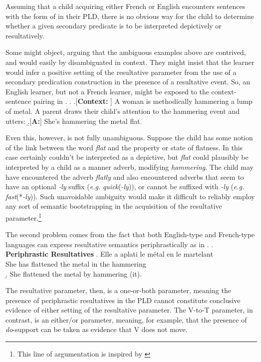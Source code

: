 \documentclass[MilwayThesis]{subfiles}
\begin{document}
Assuming that a child acquiring either French or English encounters sentences with the form of \LLast in their PLD, there is no obvious way for the child to determine whether a given secondary predicate is to be interpreted depictively or resultatively.

Some might object, arguing that the ambiguous examples above are contrived, and would easily by disambiguated in context.
They might insist that the learner would infer a positive setting of the resultative parameter from the use of a secondary predication construction in the presence of a resultative event.
So, an English learner, but not a French learner, might be exposed to the context-sentence pairing in \Next.
\ex. 
\a.[\textbf{Context:} ] A woman is methodically hammering a lump of metal.
A parent draws their child's attention to the hammering event and utters:
\b.[\textbf{A:}] She's hammering the metal flat.

Even this, however, is not fully unambiguous.
Suppose the child has some notion of the link between the word \textit{flat} and the property or state of flatness.
In this case \Last[b] certainly couldn't be interpreted as a depictive, but \textit{flat} could plausibly be interpreted by a child as a manner adverb, modifying \textit{hammering}.
The child may have encountered the adverb \textit{flatly} and also encountered adverbs that seem to have an optional \textit{-ly} suffix (\textit{e.g.} \textit{quick}(\textit{-ly})), or cannot be suffixed with \textit{-ly} (\textit{e.g.} \textit{fast}(*\textit{-ly})).
Such unavoidable ambiguity would make it difficult to reliably employ any sort of semantic bootstrapping in the acquisition of the resultative parameter.\footnote{
	This line of argumentation is inspired by \textcite{gleitman1990structural,carey1985constraints,quine1960word} 
}

The second problem comes from the fact that both English-type and French-type languages can express resultative semantics periphrastically as in \Next.
\ex. \textbf{Periphrastic Resultatives}
\ag. Elle a aplati le m\'etal en le martelant\\
She has flattened the metal in the hammering\\
\b. She flattened the metal by hammering (it).

The resultative parameter, then, is a one-or-both parameter, meaning the presence of periphrastic resultatives in the PLD cannot constitute conclusive evidence of either setting of the resultative parameter.
The V-to-T parameter, in contrast, is an either/or parameter, meaning, for example, that the presence of \textit{do}-support can be taken as evidence that V does not move.
\end{document}
